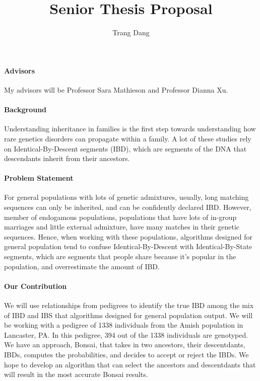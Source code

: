\documentclass[12pt]{article}
\title{Senior Thesis Proposal}
\author{Trang Dang}
\makeatletter
\let\inserttitle\@title
\let\insertauthor\@author
\makeatother
\begin{document}
\begin{center}
  \LARGE{\inserttitle}

  \Large{\insertauthor}
\end{center}

\paragraph*{Advisors}

My advisors will be Professor Sara Mathieson and Professor Dianna Xu.

\paragraph*{Background}

Understanding inheritance in families is the first step towards understanding how rare genetics disorders can propagate within a family. A lot of these studies rely on Identical-By-Descent segments (IBD), which are segments of the DNA that descendants inherit from their ancestors. 

\paragraph*{Problem Statement}

For general populations with lots of genetic admixtures, usually, long matching sequences can only be inherited, and can be confidently declared IBD. 
However, member of endogamous populations, populations that have lots of in-group marriages and little external admixture, have many matches in their genetic sequences. Hence, when working with these populations, algorithms designed for general population tend to confuse Identical-By-Descent with Identical-By-State segments, which are segments that people share because it's popular in the population, and overrestimate the amount of IBD. 

\paragraph*{Our Contribution}
We will use relationships from pedigrees to identify the true IBD among the mix of IBD and IBS that algorithms designed for general population output. 
We will be working with a pedigree of 1338 individuals from the Amish population in Lancaster, PA. In this pedigree, 394 out of the 1338 individuals are genotyped\cite{Finke2021}. 
We have an approach, Bonsai\cite{Jewett2021}, that takes in two ancestors, their descentdants, IBDs, computes the probabilities, and decides to accept or reject the IBDs. We hope to develop an algorithm that can select the ancestors and descentdants that will result in the most accurate Bonsai results.
\end{document}
